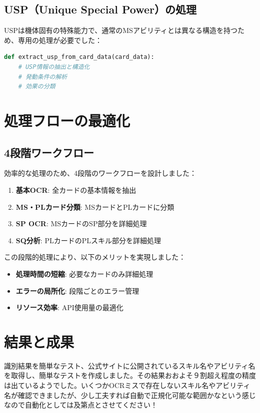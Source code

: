 \subsection*{USP（Unique Special Power）の処理}

USPは機体固有の特殊能力で、通常のMSアビリティとは異なる構造を持つため、専用の処理が必要でした：

\begin{lstlisting}[language=Python]
def extract_usp_from_card_data(card_data):
    # USP情報の抽出と構造化
    # 発動条件の解析
    # 効果の分類
\end{lstlisting}


\section*{処理フローの最適化}

\subsection*{4段階ワークフロー}

効率的な処理のため、4段階のワークフローを設計しました：

\begin{enumerate}
    \item \textbf{基本OCR}: 全カードの基本情報を抽出
    \item \textbf{MS・PLカード分類}: MSカードとPLカードに分類
    \item \textbf{SP OCR}: MSカードのSP部分を詳細処理
    \item \textbf{SQ分析}: PLカードのPLスキル部分を詳細処理
\end{enumerate}

この段階的処理により、以下のメリットを実現しました：
\begin{itemize}
    \item \textbf{処理時間の短縮}: 必要なカードのみ詳細処理
    \item \textbf{エラーの局所化}: 段階ごとのエラー管理
    \item \textbf{リソース効率}: API使用量の最適化
\end{itemize}

\section*{結果と成果}
識別結果を簡単なテスト、公式サイトに公開されているスキル名やアビリティ名を取得し、簡単なテストを作成しました。その結果おおよそ９割超え程度の精度は出ているようでした。いくつかOCRミスで存在しないスキル名やアビリティ名が確認できましたが、少し工夫すれば自動で正規化可能な範囲かなという感じなので自動化としては及第点とさせてください！

